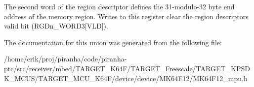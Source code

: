 The second word of the region descriptor defines the 31-\/modulo-\/32 byte end address of the memory region. Writes to this register clear the region descriptor\textquotesingle{}s valid bit (R\+G\+Dn\+\_\+\+W\+O\+R\+D3\mbox{[}V\+LD\mbox{]}). 

The documentation for this union was generated from the following file\+:\begin{DoxyCompactItemize}
\item 
/home/erik/proj/piranha/code/piranha-\/ptc/src/receiver/mbed/\+T\+A\+R\+G\+E\+T\+\_\+\+K64\+F/\+T\+A\+R\+G\+E\+T\+\_\+\+Freescale/\+T\+A\+R\+G\+E\+T\+\_\+\+K\+P\+S\+D\+K\+\_\+\+M\+C\+U\+S/\+T\+A\+R\+G\+E\+T\+\_\+\+M\+C\+U\+\_\+\+K64\+F/device/device/\+M\+K64\+F12/M\+K64\+F12\+\_\+mpu.\+h\end{DoxyCompactItemize}
